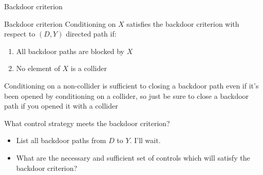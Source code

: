 \documentclass{beamer}
\begin{document}
\begin{frame}{Backdoor criterion}


  \begin{block}{Backdoor criterion}
    Conditioning on $X$ satisfies the backdoor criterion with respect to $(D,Y)$ directed path if:
    \begin{enumerate}
      \item All backdoor paths are blocked by $X$
      \item No element of $X$ is a collider

    \end{enumerate}

    
  \end{block}
       Conditioning on a non-collider is sufficient to closing a backdoor path even if it's been opened by conditioning on a collider, so just be sure to close a backdoor path if you opened it with a collider


\end{frame}

\begin{frame}{What control strategy meets the backdoor criterion?}
  \begin{itemize}
    \item List all backdoor paths from $D$ to $Y$. I'll wait.

          \begin{center}
          \end{center}

    \item What are the necessary and sufficient set of controls which will satisfy the backdoor criterion?
  \end{itemize}

  \framebreak




\end{frame}
\end{document}
